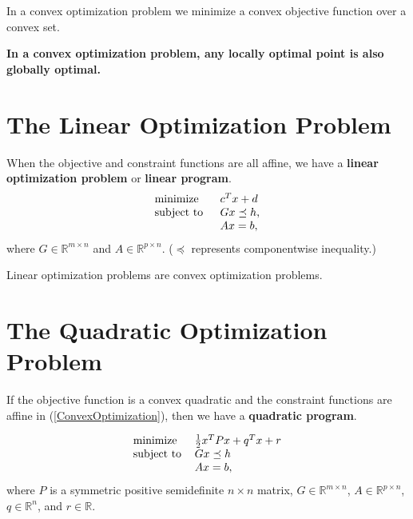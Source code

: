\documentclass[11pt]{article}
\begin{document}
In a convex optimization problem we minimize a convex objective function over a convex set.

\textbf{In a convex optimization problem, any {\color{tiananmen}\textbf{locally optimal point}} is also {\color{tiananmen}\textbf{globally optimal}}.}

\section{The Linear Optimization Problem}

When the objective and constraint functions are all affine, we have a {\color{tiananmen}\textbf{linear optimization problem}} or {\color{tiananmen}\textbf{linear program}}.
{\color{baystate}
	\begin{equation}
		\begin{tabular}{ll}
			\text{minimize }   & $c^Tx+d$       \\
			\text{subject to } & $Gx\preceq h$, \\
			& $Ax=b,$      
		\end{tabular}\label{LinearOptimization}
	\end{equation}
where $G\in\mathbb{R}^{m\times n}$ and $A\in\mathbb{R}^{p\times n}$.} ($\preceq$ represents componentwise inequality.)

Linear optimization problems are convex optimization problems.


\section{The Quadratic Optimization Problem}

If the objective function is a convex quadratic and the constraint functions are affine in (\ref{ConvexOptimization}), then we have a {\color{tiananmen}\textbf{quadratic program}}.

{\color{baystate}
	\begin{equation}
		\begin{tabular}{ll}
			\text{minimize} & $\frac{1}{2}x^TPx+q^Tx+r$ \\
			\text{subject to} & $Gx\preceq h$\\
			& $Ax=b,$
		\end{tabular}\label{QuadraticOptimization}
	\end{equation}
where $P$ is a symmetric positive semidefinite $n\times n$ matrix, $G\in\mathbb{R}^{m\times n}$,  $A\in\mathbb{R}^{p\times n}$, $q\in\mathbb{R}^n$, and $r\in\mathbb{R}$}.
\end{document}

